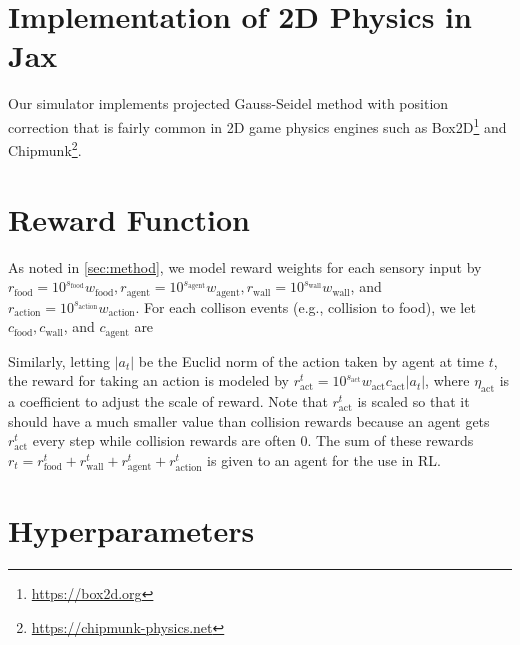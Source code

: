 \section{Implementation of 2D Physics in Jax}\label{ap:phys}
Our simulator implements projected Gauss-Seidel method with position correction \citep{catto2005iterative} that is fairly common in 2D game physics engines such as Box2D\footnote{\url{https://box2d.org}} and Chipmunk\footnote{\url{https://chipmunk-physics.net}}.

\section{Reward Function}\label{ap:reward}
As noted in \cref{sec:method}, we model reward weights for each sensory input by $r_{\mathrm{food}} = 10^{s_{\mathrm{food}}} w_{\mathrm{food}}, r_{\mathrm{agent}} = 10^{s_{\mathrm{agent}}} w_{\mathrm{agent}}, r_{\mathrm{wall}} = 10^{s_{\mathrm{wall}}} w_{\mathrm{wall}}$, and $r_{\mathrm{action}} = 10^{s_{\mathrm{action}}} w_{\mathrm{action}}$. For each collison events (e.g., collision to food), we let $c_{\mathrm{food}}, c_{\mathrm{wall}}$, and $c_{\mathrm{agent}}$ are

Similarly, letting $|a_t|$ be the Euclid norm of the action taken by agent at time $t$, the reward for taking an action is modeled by $r_{\mathrm{act}}^{t} = 10^{s_{\mathrm{act}}} w_{\mathrm{act}} c_\mathrm{act} |a_t|$, where $\eta_\mathrm{act}$ is a coefficient to adjust the scale of reward. Note that $r_{\mathrm{act}}^{t}$ is scaled so that it should have a much smaller value than collision rewards because an agent gets $r_{\mathrm{act}}^{t}$ every step while collision rewards are often $0$. The sum of these rewards $r_t = r_{\mathrm{food}}^{t} + r_{\mathrm{wall}}^{t} + r_{\mathrm{agent}}^{t} + r_{\mathrm{action}}^{t}$ is given to an agent for the use in RL.


\section{Hyperparameters}\label{ap:param}


